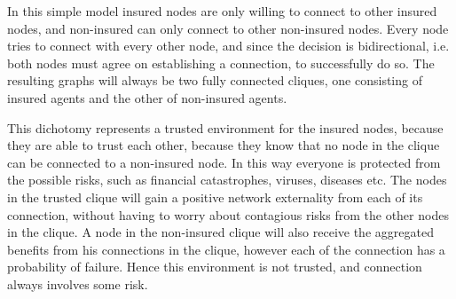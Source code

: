 In this simple model insured nodes are only willing to connect to other insured nodes, and non-insured can only connect to other non-insured nodes. Every node tries to connect with every other node, and since the decision is bidirectional, i.e. both nodes must agree on establishing a connection, to successfully do so. The resulting graphs will always be two fully connected cliques, one consisting of insured agents and the other of non-insured agents. 

This dichotomy represents a trusted environment for the insured nodes, because they are able to trust each other, because they know that no node in the clique can be connected to a non-insured node. In this way everyone is protected from the possible risks, such as financial catastrophes, viruses, diseases etc. 
The nodes in the trusted clique will gain a positive network externality from each of its connection, without having to worry about contagious risks from the other nodes in the clique.
A node in the non-insured clique will also receive the aggregated benefits from his connections in the clique, however each of the connection has a probability of failure. Hence this environment is not trusted, and connection always involves some risk. 

